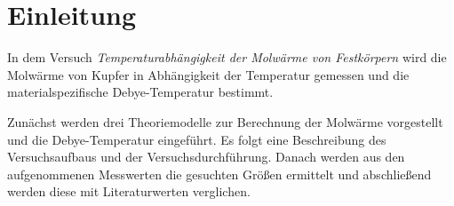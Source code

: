 

\section{Einleitung}
In dem Versuch \textit{Temperaturabhängigkeit der Molwärme von Festkörpern} 
wird die Molwärme von Kupfer in Abhängigkeit der 
Temperatur gemessen und die materialspezifische Debye-Temperatur bestimmt. 

Zunächst werden drei Theoriemodelle zur Berechnung der Molwärme 
vorgestellt und die Debye-Temperatur eingeführt. Es folgt eine 
Beschreibung des Versuchsaufbaus und der Versuchsdurchführung. Danach werden 
aus den aufgenommenen Messwerten die gesuchten Größen ermittelt und 
abschließend werden diese mit Literaturwerten verglichen.